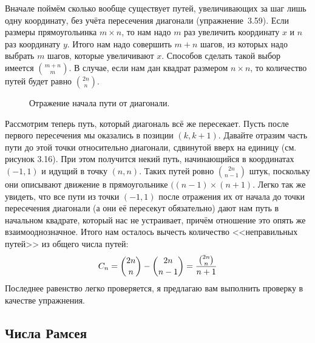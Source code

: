 Вначале поймём сколько вообще существует путей, увеличивающих за шаг лишь одну координату, без учёта пересечения диагонали (упражнение~3.59). Если размеры прямоугольинка $m\times n$, то нам надо $m$ раз увеличить координату $x$ и $n$ раз координату $y$. Итого нам надо совершить $m+n$ шагов, из которых надо выбрать $m$ шагов, которые увеличивают $x$. Способов сделать такой выбор имеется ${m + n \choose m}$. В случае, если нам дан квадрат размером $n\times n$, то количество путей будет равно ${2n\choose n}$.

\begin{figure}[h]
\caption{Отражение начала пути от диагонали.}
\end{figure}

Рассмотрим теперь путь, который диагональ всё же пересекает. Пусть после первого пересечения мы оказались в позиции $(k, k+1)$. Давайте отразим часть пути до этой точки относительно диагонали, сдвинутой вверх на единицу (см. рисунок 3.16). При этом получится некий путь, начинающийся в координатах $(-1, 1)$ и идущий в точку $(n, n)$. Таких путей ровно ${2n\choose n-1}$ штук, поскольку они описывают движение в прямоугольнике $((n-1)\times (n+1)$. Легко так же увидеть, что все пути из точки $(-1, 1)$ после отражения их от начала до точки пересечения диагонали (а они её пересекут обязательно) дают нам путь в начальном квадрате, который нас не устраивает, причём отношение это опять же взаимооднозначное. Итого нам осталось вычесть количество <<неправильных путей>> из общего числа путей:
$$C_n = {2n\choose n} - {2n\choose n-1} = {{2n\choose n}\over n+1}$$
Последнее равенство легко проверяется, я предлагаю вам выполнить проверку в качестве упражнения.

\subsection{Числа Рамсея}

